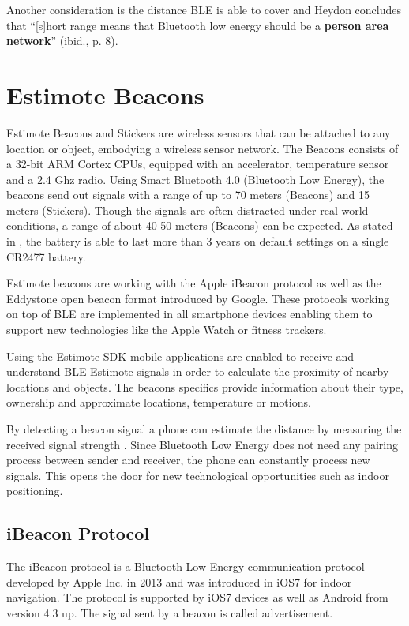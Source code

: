 Another consideration is the distance BLE is able to cover and Heydon concludes that \enquote{[s]hort range means that Bluetooth low energy should be a \textbf{person area network}} (ibid., p. 8).


\vspace{0.5cm}

\section{Estimote Beacons}

Estimote Beacons and Stickers are wireless sensors that can be attached to any location or object, embodying a wireless sensor network. The Beacons consists of a 32-bit ARM Cortex CPUs, equipped with an accelerator, temperature sensor and a 2.4 Ghz radio. Using Smart Bluetooth 4.0 (Bluetooth Low Energy), the beacons send out signals with a range of up to 70 meters (Beacons) and 15 meters (Stickers). Though the signals are often distracted under real world conditions, a range of about 40-50 meters (Beacons) can be expected. As stated in \cite{Estimote}, the battery is able to last more than 3 years on default settings on a single CR2477 battery.

Estimote beacons are working with the Apple iBeacon protocol as well as the Eddystone open beacon format introduced by Google. These protocols working on top of BLE are implemented in all smartphone devices enabling them to support new technologies like the Apple Watch or fitness trackers.

Using the Estimote SDK \cite{Estimote} mobile applications are enabled to receive and understand BLE Estimote signals in order to calculate the proximity of nearby locations and objects. The beacons specifics provide information about their type, ownership and approximate locations, temperature or motions.

By detecting a beacon signal a phone can estimate the distance by measuring the received signal strength \cite{Estimote}. Since Bluetooth Low Energy does not need any pairing process between sender and receiver, the phone can constantly process new signals. This opens the door for new technological opportunities such as indoor positioning.


\subsection{iBeacon Protocol}

The iBeacon protocol is a Bluetooth Low Energy communication protocol developed by Apple Inc. in 2013 and was introduced in iOS7 for indoor navigation. The protocol is supported by iOS7 devices as well as Android from version 4.3 up. The signal sent by a beacon is called advertisement.

